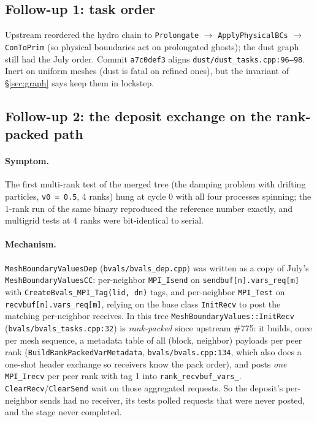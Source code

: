 \documentclass[11pt]{article}
\newcommand{\code}[1]{\texttt{#1}}
\newcommand{\file}[1]{\texttt{\small #1}}
\newcommand{\fn}[1]{\texttt{\small #1}}
\begin{document}
\subsection{Follow-up 1: task order}

Upstream reordered the hydro chain to \fn{Prolongate} $\to$ \fn{ApplyPhysicalBCs}
$\to$ \fn{ConToPrim} (so physical boundaries act on prolongated ghosts); the dust
graph still had the July order. Commit \code{a7c0def3} aligns
\file{dust/dust\_tasks.cpp:96--98}. Inert on uniform meshes (dust is fatal on refined
ones), but the invariant of \S\ref{sec:graph} says keep them in lockstep.

\subsection{Follow-up 2: the deposit exchange on the rank-packed path}
\label{sec:rankpacked}

\paragraph{Symptom.} The first multi-rank test of the merged tree (the damping
problem with drifting particles, \code{v0 = 0.5}, 4 ranks) hung at cycle 0 with all
four processes spinning; the 1-rank run of the same binary reproduced the reference
number exactly, and multigrid tests at 4 ranks were bit-identical to serial.

\paragraph{Mechanism.} \code{MeshBoundaryValuesDep} (\file{bvals/bvals\_dep.cpp})
was written as a copy of July's \code{MeshBoundaryValuesCC}: per-neighbor
\code{MPI\_Isend} on \code{sendbuf[n].vars\_req[m]} with
\fn{CreateBvals\_MPI\_Tag(lid, dn)} tags, and per-neighbor \code{MPI\_Test} on
\code{recvbuf[n].vars\_req[m]}, relying on the base class \fn{InitRecv} to post the
matching per-neighbor receives. In this tree \fn{MeshBoundaryValues::InitRecv}
(\file{bvals/bvals\_tasks.cpp:32}) is \emph{rank-packed} since upstream \#775: it
builds, once per mesh sequence, a metadata table of all (block, neighbor) payloads
per peer rank (\fn{BuildRankPackedVarMetadata}, \file{bvals/bvals.cpp:134}, which
also does a one-shot header exchange so receivers know the pack order), and posts
\emph{one} \code{MPI\_Irecv} per peer rank with tag 1 into
\code{rank\_recvbuf\_vars\_}. \fn{ClearRecv}/\fn{ClearSend} wait on those aggregated
requests. So the deposit's per-neighbor sends had no receiver, its tests polled
requests that were never posted, and the stage never completed.
\end{document}
